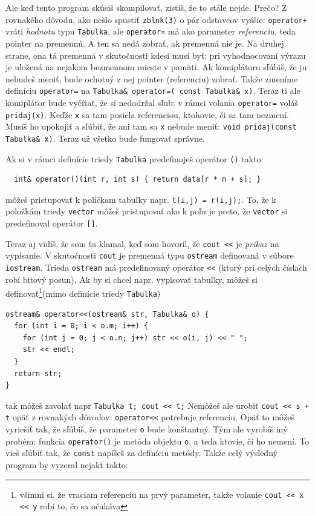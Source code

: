 \documentclass[10pt]{article}
\def\prg{\lstinline}
\def\ods{\vspace*{10pt}}
\begin{document}
\ods
Ale keď tento program skúsiš skompilovať, zistíš, že to stále nejde. Prečo? Z rovnakého
dôvodu, ako nešlo spustiť {\tt zblnk(3)} o pár odstavcov vyššie: \prg!operator+!
vráti {\em hodnotu} typu {\tt Tabulka}, ale \prg!operator=! má ako parameter
{\em referenciu}, teda pointer na premennú. A ten sa nedá zobrať, ak premenná nie je.
Na druhej strane, ona tá premenná v skutočnosti kdesi musí byť: pri vyhodnocovaní výrazu
je uložená na nejakom bezmennom mieste v pamäti. Ak komiplátoru sľúbiš, že ju nebudeš
meniť, bude ochotný z nej pointer (referenciu) zobrať. Takže zmeníme definíciu 
\prg!operator=! na 
\prg!Tabulka& operator=( const Tabulka& x)!. Teraz ti ale komiplátor bude vyčítať, že si 
nedodržal sľub: v rámci volania \prg!operator=! voláš {\tt pridaj(x)}. Keďže {\tt x}
sa tam posiela referenciou, ktohovie, či sa tam nezmení. Musíš ho upokojiť a sľúbiť, že
ani tam sa {\tt x} nebude meniť: \prg!void pridaj(const Tabulka& x)!. Teraz už všetko
bude fungovať správne.


\ods Ak si v rámci definície triedy {\tt Tabulka} predefinuješ operátor {\tt ()}
takto:

\begin{lstlisting}
  int& operator()(int r, int s) { return data[r * n + s]; }
\end{lstlisting}

môžeš pristupovať k políčkam tabuľky napr. \prg!t(i,j) = r(i,j);!. 
To, že k 
položkám triedy {\tt vector} môžeš pristupovať ako k poľu je preto, že {\tt vector}
si predefinoval operátor {\tt []}.

\ods
Teraz aj vidíš, že som ťa klamal, keď som hovoril, že \prg!cout <<! je {\em príkaz}
na vypísanie. V skutočnosti \prg!cout! je premenná typu \prg!ostream! 
definovaná v súbore \prg!iostream!. Trieda \prg!ostream! má predefinovaný operátor
{\tt <<} (ktorý pri celých číslach robí bitový posun). Ak by si chcel napr. vypisovať
tabuľky, môžeš si definovať\footnote{%
všimni si, že vraciam referenciu na prvý parameter, takže volanie \prg!cout << x << y!
robí to, čo sa očakáva
}(mimo definície triedy {\tt Tabulka})

\begin{lstlisting}
ostream& operator<<(ostream& str, Tabulka& o) {
  for (int i = 0; i < o.m; i++) {
    for (int j = 0; j < o.n; j++) str << o(i, j) << " ";
    str << endl;
  }
  return str;
}
\end{lstlisting}

tak môžeš zavolať napr \prg!Tabulka t; cout << t;! Nemôžeš ale urobiť \prg!cout << s + t!
opäť z rovnakých dôvodov: \prg!operator<<! potrebuje referenciu. Opäť to môžeš
vyriešiť tak, že sľúbiš, že parameter {\tt o} bude konštantný. Tým ale vyrobíš iný probém:
funkcia \prg!operator()! je metóda objektu {\tt o}, a teda ktovie, či ho nemení. To
vieš sľúbiť tak, že \prg!const! napíšeš za definíciu metódy. Takže celý
výsledný program by vyzeral nejakt takto:
\end{document}
